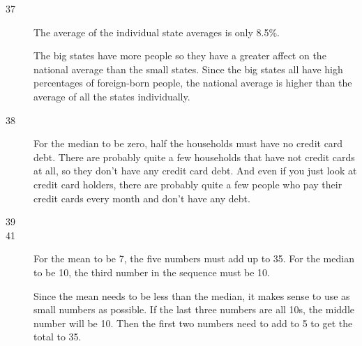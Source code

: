 \documentclass{exam}
\begin{document}
\begin{description}
\begin{parts}
        \end{parts}

      \item[37]
        The average of the individual state averages is only 8.5\%.

        The big states have more people so they have a greater affect on the national average than the small states.
        Since the big states all have high percentages of foreign-born people, the national average is higher than the
        average of all the states individually.

      \item[38]
        For the median to be zero, half the households must have no credit card debt.  There are probably quite a few
        households that have not credit cards at all, so they don't have any credit card debt.  And even if you just
        look at credit card holders, there are probably quite a few people who pay their credit cards every month and
        don't have any debt.


      \item[39]

      \item[41]
        For the mean to be 7, the five numbers must add up to 35.  For the median to be 10, the third number in the
        sequence must be 10.

        Since the mean needs to be less than the median, it makes sense to use as small numbers as possible.  If the
        last three numbers are all 10s, the middle number will be 10.  Then the first two numbers need to add to 5 to
        get the total to 35.


\end{description}
\end{document}
